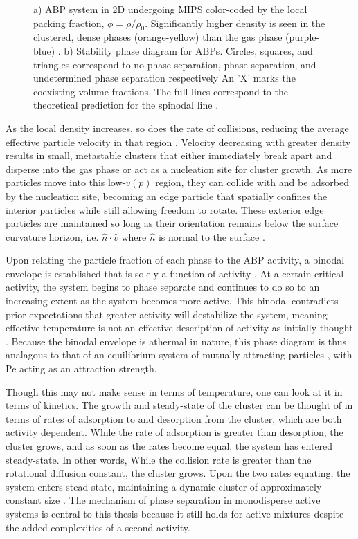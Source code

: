 \documentclass[11pt]{article}
\begin{document}
\begin{figure}[ht]
\begin{subfigure}[b]{0.45\textwidth}
         \label{fig:phase2}
     \end{subfigure}
        \caption{a) ABP system in 2D undergoing MIPS color-coded by the local packing fraction, $\phi=\rho/\rho_0$.  Significantly higher density is seen in the clustered, dense phases (orange-yellow) than the gas phase (purple-blue) \cite{Gonnella}. b) Stability phase diagram for ABPs. Circles, squares, and triangles correspond to no phase separation, phase separation, and undetermined phase separation respectively An 'X' marks the coexisting volume fractions. The full lines correspond to the theoretical prediction for the spinodal line \cite{Nie}.}
        \label{fig:three graphs}
\end{figure}

As the local density increases, so does the rate of collisions, reducing the average effective particle velocity in that region \cite{Tailleur, Cates}.  Velocity decreasing with greater density results in small, metastable clusters that either immediately break apart and disperse into the gas phase or act as a nucleation site for cluster growth. As more particles move into this low-$v(p)$ region, they can collide with and be adsorbed by the nucleation site, becoming an edge particle that spatially confines the interior particles while still allowing freedom to rotate. These exterior edge particles are maintained so long as their orientation remains below the surface curvature horizon, i.e. $\hat{n}\cdot\hat{v}$ where $\hat{n}$ is normal to the surface \cite{Cates}. 

Upon relating the particle fraction of each phase to the ABP activity, a binodal envelope is established that is solely a function of activity \cite{Redner}.  At a certain critical activity, the system begins to phase separate and continues to do so to an increasing extent as the system becomes more active.  This binodal contradicts prior expectations that greater activity will destabilize the system, meaning effective temperature is not an effective description of activity as initially thought \cite{Schwarz-Linek}.  Because the binodal envelope is athermal in nature, this phase diagram is thus analagous to that of an equilibrium system of mutually attracting particles \cite{Nguemaha}, with Pe acting as an attraction strength. 

Though this may not make sense in terms of temperature, one can look at it in terms of kinetics. The growth and steady-state of the cluster can be thought of in terms of rates of adsorption to and desorption from the cluster, which are both activity dependent. While the rate of adsorption is greater than desorption, the cluster grows, and as soon as the rates become equal, the system has entered steady-state.  In other words, While the collision rate is greater than the rotational diffusion constant, the cluster grows.  Upon the two rates equating, the system enters stead-state, maintaining a dynamic cluster of approximately constant size \cite{Redner}. The mechanism of phase separation in monodisperse active systems is central to this thesis because it still holds for active mixtures despite the added complexities of a second activity.
\end{document}

